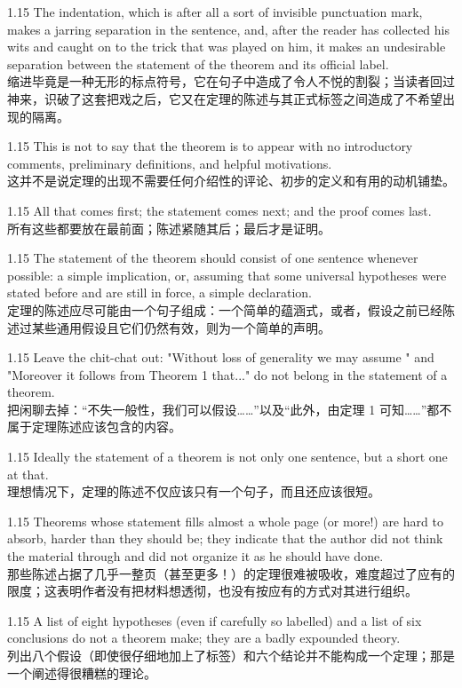 \documentclass[12pt,a4paper]{article}
\newcommand{\bilingual}[2]{
    \begin{spacing}{1.15} %
        \noindent \normalsize #1 \\[-0.5ex] %
        \small \textcolor{blue!70!black}{#2} %
    \end{spacing}
    \vspace{0.8em} %
}
\begin{document}
\bilingual{The indentation, which is after all a sort of invisible punctuation mark, makes a jarring separation in the sentence, and, after the reader has collected his wits and caught on to the trick that was played on him, it makes an undesirable separation between the statement of the theorem and its official label.}
{缩进毕竟是一种无形的标点符号，它在句子中造成了令人不悦的割裂；当读者回过神来，识破了这套把戏之后，它又在定理的陈述与其正式标签之间造成了不希望出现的隔离。} %

\bilingual{This is not to say that the theorem is to appear with no introductory comments, preliminary definitions, and helpful motivations.}
{这并不是说定理的出现不需要任何介绍性的评论、初步的定义和有用的动机铺垫。} %

\bilingual{All that comes first; the statement comes next; and the proof comes last.}
{所有这些都要放在最前面；陈述紧随其后；最后才是证明。} %

\bilingual{The statement of the theorem should consist of one sentence whenever possible: a simple implication, or, assuming that some universal hypotheses were stated before and are still in force, a simple declaration.}
{定理的陈述应尽可能由一个句子组成：一个简单的蕴涵式，或者，假设之前已经陈述过某些通用假设且它们仍然有效，则为一个简单的声明。} %

\bilingual{Leave the chit-chat out: "Without loss of generality we may assume " and "Moreover it follows from Theorem 1 that..." do not belong in the statement of a theorem.}
{把闲聊去掉：“不失一般性，我们可以假设……”以及“此外，由定理 1 可知……”都不属于定理陈述应该包含的内容。} %

\bilingual{Ideally the statement of a theorem is not only one sentence, but a short one at that.}
{理想情况下，定理的陈述不仅应该只有一个句子，而且还应该很短。} %

\bilingual{Theorems whose statement fills almost a whole page (or more!) are hard to absorb, harder than they should be; they indicate that the author did not think the material through and did not organize it as he should have done.}
{那些陈述占据了几乎一整页（甚至更多！）的定理很难被吸收，难度超过了应有的限度；这表明作者没有把材料想透彻，也没有按应有的方式对其进行组织。} %

\bilingual{A list of eight hypotheses (even if carefully so labelled) and a list of six conclusions do not a theorem make; they are a badly expounded theory.}
{列出八个假设（即使很仔细地加上了标签）和六个结论并不能构成一个定理；那是一个阐述得很糟糕的理论。} %
\end{document}
